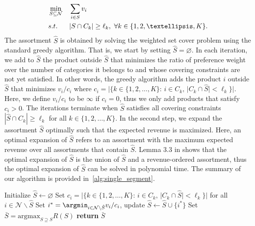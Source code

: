 \documentclass[msom,non-blindrev]{informs3} %
\theoremstyle{definition}
\begin{document}
\begin{equation}
\label{step1}
\begin{aligned}
&\min_{S\subseteq\mathcal{N}} && \sum_{i \in S} v_i\\
&\textup{s.t.} && |S\cap C_k|\geq \ell_k,\ \forall k\in\{1,2,\dots,K\}.\\
\end{aligned}
\end{equation}
The assortment $\hat{S}$ is obtained by solving the weighted set cover problem using the standard greedy algorithm. That is, we start by setting $\hat{S}=\varnothing$. In each iteration, we add to $\hat{S}$ the product outside $\hat{S}$ that minimizes the ratio of preference weight over the number of categories it belongs to and whose covering constraints are not yet satisfied. In other words, the greedy algorithm adds the product $i$ outside $\hat S$ that minimizes $v_i/c_i$ where $c_i=|\{k\in\{1,2,\dots,K\}:\,i\in C_k,\,|C_k\cap \hat{S}|<\ell_k\}|$. Here, we define $v_i/c_i$ to be $\infty$ if $c_i=0$, thus we only add products that satisfy $c_i>0$.
The iterations terminate when $\hat{S}$ satisfies all covering constraints $|\hat{S}\cap C_k|\geq \ell_k$ for all $k\in\{1,2,\dots,K\}$. In the second step, we  expand the assortment $\hat{S}$ optimally such that the expected revenue is maximized. 
Here, an optimal expansion of $\hat{S}$ refers to an assortment  with the maximum expected revenue over all assortments that contain $\hat S$. Lemma 3.3 in \cite{barre2023assortment} shows that the optimal expansion of $\hat{S}$ is the union of $\hat{S}$ and a revenue-ordered assortment, thus the optimal expansion of $\hat{S}$ can be solved in polynomial time. The summary of our algorithm is provided in~\cref{alg:single_segment}.

\begin{algorithm}[!ht]
\SingleSpacedXI
\caption{Approximation algorithm for~\eqref{prob:deterministic_single_segment}}
\label{alg:single_segment}
\begin{algorithmic}
\State Initialize $\hat{S}\leftarrow\varnothing$
\State Set $c_i=|\{k\in\{1,2,\dots,K\}:\,i\in C_k,\,|C_k\cap \hat{S}|<\ell_k\}|$ for all $i\in\mathcal{N}\backslash\hat{S}$
\State Set $i^*=\argmin_{i\in \mathcal{N}\backslash\hat{S}} v_i/c_i$, update $\hat{S}\leftarrow \hat{S}\cup\{i^*\}$
\EndWhile
\State Set $\bar{S}=\mathrm{argmax}_{S\supseteq\hat{S}}R(S)$
\State \textbf{return} $\bar{S}$
\end{algorithmic}
\end{algorithm}
\end{document}
